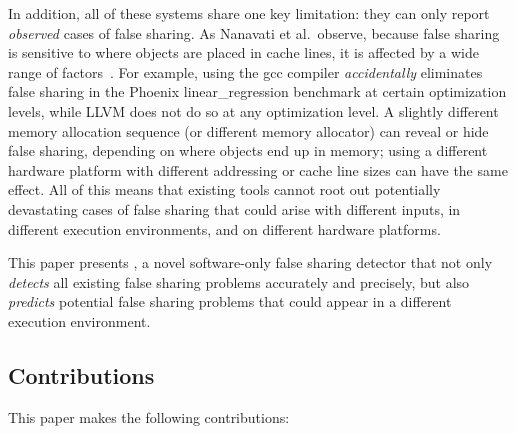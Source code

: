 In addition, all of these systems share one key limitation: they can
only report \emph{observed} cases of false sharing. As Nanavati et
al.\ observe, because false sharing is sensitive to where objects are
placed in cache lines, it is affected by a wide range of
factors~\cite{OSdetection}. For example, using the gcc compiler
\emph{accidentally} eliminates false sharing in the Phoenix
linear\_regression benchmark at certain optimization levels, while
LLVM does not do so at any optimization level.  A slightly different memory
allocation sequence (or different memory allocator) can reveal or hide
false sharing, depending on where objects end up in memory; using a
different hardware platform with different addressing or cache line
sizes can have the same effect. All of this means that existing
tools cannot root out potentially devastating cases of false sharing
that could arise with different inputs, in different execution
environments, and on different hardware platforms.




This paper presents \Predator{}, a novel software-only false sharing
detector that not only \emph{detects} all existing false sharing
problems accurately and precisely, but also \emph{predicts} potential
false sharing problems that could appear in a  different execution
environment.

\subsection*{Contributions}

This paper makes the following contributions:

